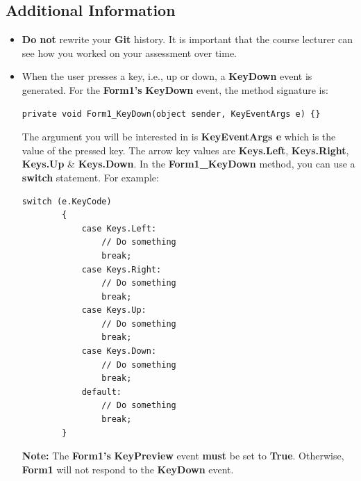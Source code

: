 \documentclass{article}
\begin{document}
\subsection*{Additional Information}
\begin{itemize}
    \item \textbf{Do not} rewrite your \textbf{Git} history. It is important that the course lecturer can see how you worked on your assessment over time.
    \item When the user presses a key, i.e., up or down, a \textbf{KeyDown} event is generated. For the \textbf{Form1's} \textbf{KeyDown} event, the method signature is:
    \begin{Verbatim}[tabsize=2]
		private void Form1_KeyDown(object sender, KeyEventArgs e) {}
	\end{Verbatim}
	The argument you will be interested in is \textbf{KeyEventArgs e} which is the value of the pressed key. The arrow key values are \textbf{Keys.Left}, \textbf{Keys.Right}, \textbf{Keys.Up} \& \textbf{Keys.Down}. In the \textbf{Form1\_KeyDown} method, you can use a \textbf{switch} statement. For example:
	\begin{Verbatim}[tabsize=2]
		switch (e.KeyCode) 
		{
			case Keys.Left:
				// Do something
				break;
			case Keys.Right:
				// Do something
				break;
			case Keys.Up:
				// Do something
				break;
			case Keys.Down:
				// Do something
				break;
			default:
				// Do something
				break;
		}
	\end{Verbatim}
	\textbf{Note:} The \textbf{Form1's} \textbf{KeyPreview} event \textbf{must} be set to \textbf{True}. Otherwise, \textbf{Form1} will not respond to the \textbf{KeyDown} event.
\end{itemize}
\end{document}
